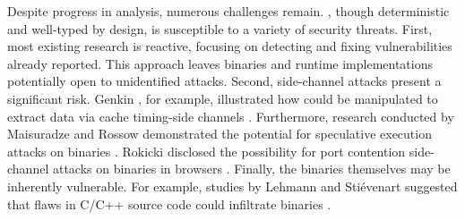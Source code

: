 \label{background:wasm:challenges} 
Despite progress in \Wasm analysis, numerous challenges remain. 
\Wasm, though deterministic and well-typed by design, is susceptible to a variety of security threats. 
First, most existing \Wasm research is reactive, focusing on detecting and fixing vulnerabilities already reported. 
This approach leaves \Wasm binaries and runtime implementations potentially open to unidentified attacks. 
Second, side-channel attacks present a significant risk. 
Genkin \etal, for example, illustrated how \Wasm could be manipulated to extract data via cache timing-side channels \cite{Genkin2018DrivebyKC}. 
Furthermore, research conducted by Maisuradze and Rossow demonstrated the potential for speculative execution attacks on \Wasm binaries \cite{ret2spec}. 
Rokicki \etal disclosed the possibility for port contention side-channel attacks on \Wasm binaries in browsers \cite{10.1145/3488932.3517411}. 
Finally, the binaries themselves may be inherently vulnerable. 
For example, studies by Lehmann \etal and Stiévenart \etal suggested that flaws in C/C++ source code could infiltrate \Wasm binaries \cite{usenixWasm2020, DeRoover2022}.
 
